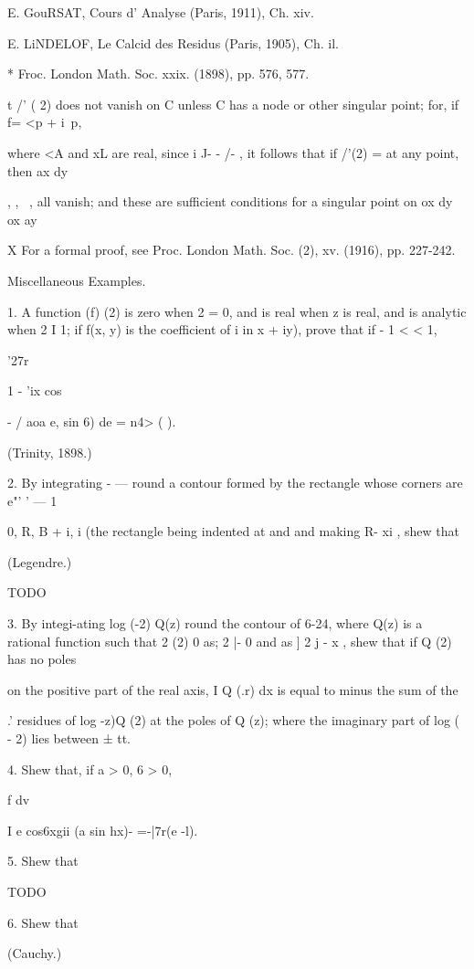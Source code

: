 E. GouRSAT, Cours d' Analyse (Paris, 1911), Ch. xiv.

E. LiNDELOF, Le Calcid des Residus (Paris, 1905), Ch. il.

* Froc. London Math. Soc. xxix. (1898), pp. 576, 577.

t /' ( 2) does not vanish on C unless C has a node or other singular
point; for, if f= <p + i\ p,

where <A and xL are real, since i J- - /- , it follows that if /'(2) =
at any point, then ax dy

  , , ~, all vanish; and these are sufficient conditions for a
singular point on ox dy ox ay

X For a formal proof, see Proc. London Math. Soc. (2), xv. (1916), pp.
227-242.

%
%

Miscellaneous Examples.

1. A function (f) (2) is zero when 2 = 0, and is real when z is real,
and is analytic when 2 I 1; if f(x, y) is the coefficient of i in x +
iy), prove that if - 1 < < 1,

'27r

1 - 'ix cos

  - / aoa e, sin 6) de = n4> ( ).

(Trinity, 1898.)

2. By integrating - — round a contour formed by the rectangle whose
corners are e"' ' — 1

0, R, B + i, i (the rectangle being indented at and and making R- xi ,
shew that

(Legendre.)

TODO

3. By integi-ating log (-2) Q(z) round the contour of 6-24, where Q(z)
is a rational function such that 2 (2) 0 as; 2 |- 0 and as ] 2 j - x
, shew that if Q (2) has no poles

on the positive part of the real axis, I Q (.r) dx is equal to minus
the sum of the

.' residues of log -z)Q (2) at the poles of Q (z); where the
imaginary part of log ( - 2) lies between ± tt.

4. Shew that, if a > 0, 6 > 0,

f dv

I e cos6xgii (a sin hx)- =-|7r(e -l).

5. Shew that

TODO

6. Shew that

(Cauchy.)

